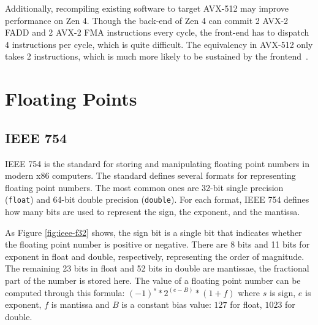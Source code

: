 \documentclass[logo,bsc,singlespacing,parskip]{infthesis}
\newcommand{\dtfloat}{\texttt{float}}
\newcommand{\dtdouble}{\texttt{double}}
\begin{document}
Additionally, recompiling existing software to target AVX-512 may improve performance on Zen 4. Though the back-end of Zen 4 can commit 2 AVX-2 FADD and 2 AVX-2 FMA instructions every cycle, the front-end has to dispatch 4 instructions per cycle, which is quite difficult. The equivalency in AVX-512 only takes 2 instructions, which is much more likely to be sustained by the frontend~\cite{Zen4Critique}.


\section{Floating Points}
\label{sec:i23}
\subsection{IEEE 754}
\label{sec:IEEE754}
IEEE 754 is the standard for storing and manipulating floating point numbers in modern x86 computers. The standard defines several formats for representing floating point numbers. The most common ones are 32-bit single precision (\dtfloat{}) and 64-bit double precision (\dtdouble{}). For each format, IEEE 754 defines how many bits are used to represent the sign, the exponent, and the mantissa. 

As Figure \ref{fig:ieee-f32} shows, the sign bit is a single bit that indicates whether the floating point number is positive or negative. There are 8 bits and 11 bits for exponent in float and double, respectively, representing the order of magnitude. The remaining 23 bits in float and 52 bits in double are mantissae, the fractional part of the number is stored here. The value of a floating point number can be computed through this formula: \begin{math} (-1)^s * 2^{(e - B)} * (1 + f)\end{math} where \begin{math}s\end{math} is sign, \begin{math}e\end{math} is exponent, \begin{math}f\end{math} is mantissa and \begin{math}B\end{math} is a constant bias value: \begin{math}127\end{math} for float, \begin{math}1023\end{math} for double. 
\end{document}
